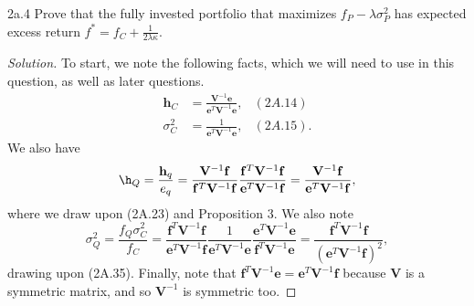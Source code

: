 \begin{problem}{2a.4}
Prove that the fully invested portfolio that maximizes $f_{P} - \lambda\sigma_{P}^{2}$ has expected excess return $f^{\ast} = f_{C} + \frac{1}{2\lambda\kappa}$.
\end{problem}

\begin{proof}[Solution]
To start, we note the following facts, which we will need to use in this question, as well as later questions.
\begin{align*}
\mathbf{h}_{C} &= \frac{\mathbf{V}^{-1}\mathbf{e}}{\mathbf{e}^{T}\mathbf{V}^{-1}\mathbf{e}}, & (2A.14)\\
\sigma_{C}^{2} &= \frac{1}{\mathbf{e}^{T}\mathbf{V}^{-1}\mathbf{e}}, & (2A.15).
\end{align*}
We also have \[\h_{Q} = \frac{\mathbf{h}_{q}}{e_{q}} = \frac{\mathbf{V}^{-1}\mathbf{f}}{\mathbf{f}^{T}\mathbf{V}^{-1}\mathbf{f}}\frac{\mathbf{f}^{T}\mathbf{V}^{-1}\mathbf{f}}{\mathbf{e}^{T}\mathbf{V}^{-1}\mathbf{f}} = \frac{\mathbf{V}^{-1}\mathbf{f}}{\mathbf{e}^{T}\mathbf{V}^{-1}\mathbf{f}},\] where we draw upon (2A.23) and Proposition 3. We also note \[\sigma_{Q}^{2} = \frac{f_{Q}\sigma_{C}^{2}}{f_{C}} = \frac{\mathbf{f}^{T}\mathbf{V}^{-1}\mathbf{f}}{\mathbf{e}^{T}\mathbf{V}^{-1}\mathbf{f}}\frac{1}{\mathbf{e}^{T}\mathbf{V}^{-1}\mathbf{e}}\frac{\mathbf{e}^{T}\mathbf{V}^{-1}\mathbf{e}}{\mathbf{f}^{T}\mathbf{V}^{-1}\mathbf{e}} = \frac{\mathbf{f}^{T}\mathbf{V}^{-1}\mathbf{f}}{(\mathbf{e}^{T}\mathbf{V}^{-1}\mathbf{f})^{2}},\] drawing upon (2A.35). Finally, note that $\mathbf{f}^{T}\mathbf{V}^{-1}\mathbf{e} = \mathbf{e}^{T}\mathbf{V}^{-1}\mathbf{f}$ because $\mathbf{V}$ is a symmetric matrix, and so $\mathbf{V}^{-1}$ is symmetric too.


\end{proof}
